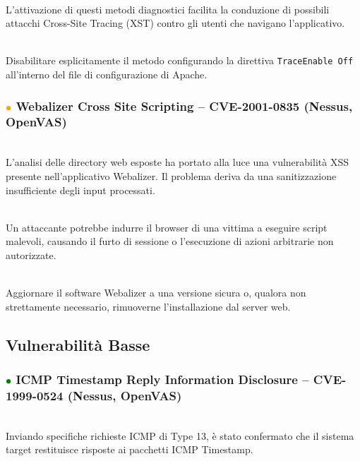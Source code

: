 \documentclass[12pt, a4paper]{article}
\begin{document}
	\vspace{0.2 cm}
	\\ \vspace{0.2 cm}
	L'attivazione di questi metodi diagnostici facilita la conduzione di possibili attacchi Cross-Site Tracing (XST) contro gli utenti che navigano l'applicativo.

	\vspace{0.2 cm}
	\\ \vspace{0.2 cm}
	Disabilitare esplicitamente il metodo configurando la direttiva \texttt{TraceEnable Off} all'interno del file di configurazione di Apache.


	\subsubsection{\textcolor{orange}{$\bullet$} Webalizer Cross Site Scripting -- CVE-2001-0835 (Nessus, OpenVAS)}
	 \\ \vspace{0.2 cm}
	L'analisi delle directory web esposte ha portato alla luce una vulnerabilità XSS presente nell'applicativo Webalizer. Il problema deriva da una sanitizzazione insufficiente degli input processati.

	\vspace{0.2 cm}
	 \\ \vspace{0.2 cm}
	Un attaccante potrebbe indurre il browser di una vittima a eseguire script malevoli, causando il furto di sessione o l'esecuzione di azioni arbitrarie non autorizzate.

	\vspace{0.2 cm}
	 \\ \vspace{0.2 cm}
	Aggiornare il software Webalizer a una versione sicura o, qualora non strettamente necessario, rimuoverne l'installazione dal server web.

	\subsection{Vulnerabilità Basse}

	\subsubsection{\textcolor{green}{$\bullet$} ICMP Timestamp Reply Information Disclosure -- CVE-1999-0524 (Nessus, OpenVAS)}
	 \\\vspace{0.2 cm}
	Inviando specifiche richieste ICMP di Type 13, è stato confermato che il sistema target restituisce risposte ai pacchetti ICMP Timestamp.
\end{document}
